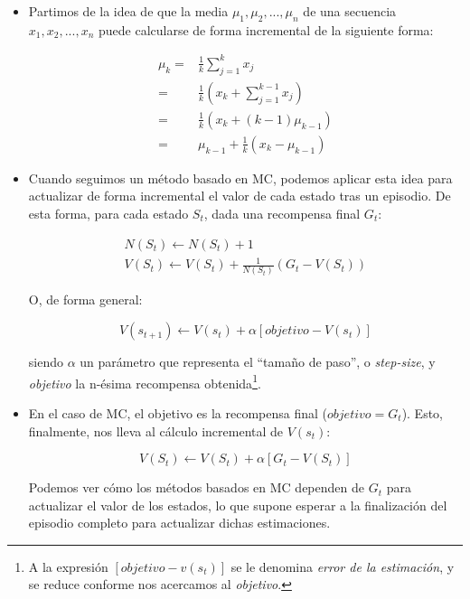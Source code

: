 \begin{itemize}
    \item Partimos de la idea de que la media $\mu_1, \mu_2, ..., \mu_n$ de una secuencia $x_1, x_2, ..., x_n$ puede calcularse de forma incremental de la siguiente forma:

    \begin{align}
        \mu_k = & \frac{1}{k} \sum_{j=1}^{k} x_j \\
              = & \frac{1}{k} (x_k + \sum_{j=1}^{k-1} x_j) \\
              = & \frac{1}{k} (x_k + (k-1)\mu_{k-1}) \\
              = & \mu_{k-1} + \frac{1}{k}(x_k - \mu_{k-1})
    \end{align}
    
    \item Cuando seguimos un método basado en MC, podemos aplicar esta idea para actualizar de forma incremental el valor de cada estado tras un episodio. De esta forma, para cada estado $S_t$, dada una recompensa final $G_t$:
    
    \begin{gather}
        N(S_t) \leftarrow N(S_t) + 1 \\
        V(S_t) \leftarrow V(S_t) + \frac{1}{N(S_t)}(G_t - V(S_t))
    \end{gather}
    
    O, de forma general:
    
    \begin{equation}
        V(s_{t+1}) \leftarrow V(s_t) + \alpha[objetivo - V(s_t)]
    \end{equation}
    
    siendo $\alpha$ un parámetro que representa el ``tamaño de paso'', o \textit{step-size}, y \textit{objetivo} la n-ésima recompensa obtenida\footnote{A la expresión $[objetivo - v(s_t)]$ se le denomina \textit{error de la estimación}, y se reduce conforme nos acercamos al \textit{objetivo}.}. 
    
    \item En el caso de MC, el objetivo es la recompensa final ($objetivo = G_t$). Esto, finalmente, nos lleva al cálculo incremental de $V(s_t)$:

    \begin{equation}
        V(S_t) \leftarrow V(S_t) + \alpha [G_t - V(S_t)]
    \end{equation}
    
    Podemos ver cómo los métodos basados en MC dependen de $G_t$ para actualizar el valor de los estados, lo que supone esperar a la finalización del episodio completo para actualizar dichas estimaciones.
\end{itemize}

